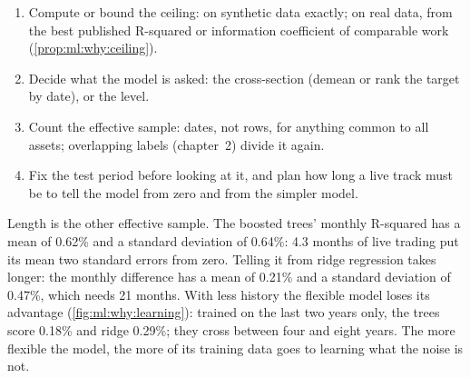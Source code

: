 \begin{method}\label{met:ml:why:before}
\begin{enumerate}
\item Compute or bound the ceiling: on synthetic data exactly; on real data, from the best published R-squared or
information coefficient of comparable work (\cref{prop:ml:why:ceiling}).
\item Decide what the model is asked: the cross-section (demean or rank the target by date), or the level.
\item Count the effective sample: dates, not rows, for anything common to all assets; overlapping labels
(chapter~2) divide it again.
\item Fix the test period before looking at it, and plan how long a live track must be to tell the model from zero and
from the simpler model.
\end{enumerate}
\end{method}

Length is the other effective sample. The boosted trees' monthly R-squared has a mean of 0.62\% and a standard deviation
of 0.64\%: 4.3 months of live trading put its mean two standard errors from zero. Telling it from ridge regression takes
longer: the monthly difference has a mean of 0.21\% and a standard deviation of 0.47\%, which needs 21 months. With less
history the flexible model loses its advantage (\cref{fig:ml:why:learning}): trained on the last two years only, the
trees score 0.18\% and ridge 0.29\%; they cross between four and eight years. The more flexible the model, the more of
its training data goes to learning what the noise is not.

\begin{omfigure}

\label{fig:ml:why:learning}
\end{omfigure}

